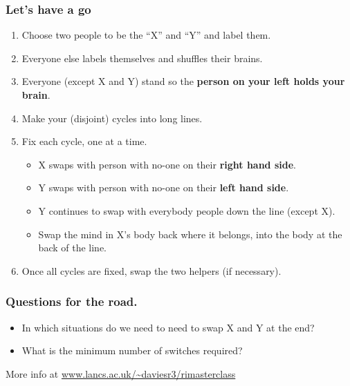 \documentclass{beamer}
\begin{document}
\begin{frame}
  \frametitle{Let's have a go}

  \begin{enumerate}
  \item   Choose two people to be the ``X'' and ``Y'' and label them. 
    \item  Everyone else labels themselves and shuffles their brains.
      \item  Everyone (except X and Y) stand so the \textbf{person on your left holds your brain}.
        \item  Make your (disjoint) cycles into long lines. 
          \item Fix each cycle, one at a time.
            \begin{itemize}
             \item  X swaps with person with no-one on their \textbf{right hand side}.
            \item  Y swaps with person with no-one on their \textbf{left hand side}.
              \item Y continues to swap with everybody people down the line (except X). 
              \item Swap the mind in X's body back where it belongs, into the body at the back of the line. 
            \end{itemize}
                         \item Once all cycles are fixed, swap the two helpers (if necessary).
  \end{enumerate}

 

\end{frame}


\begin{frame}
  \frametitle{Questions for the road.}
  \begin{itemize}
  \item In which situations do we need to need to swap X and Y at the end?
\item What is the minimum number of switches required?
  \end{itemize}

More info at \url{www.lancs.ac.uk/~daviesr3/rimasterclass}
\end{frame}


%
\end{document}
